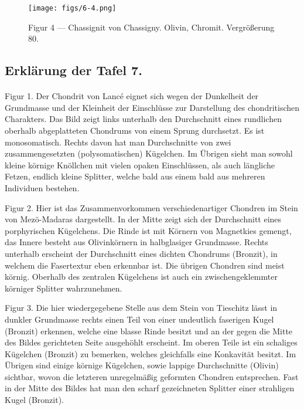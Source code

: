 \documentclass[a4paper, 11pt, oneside, polutonikogreek, german]{article}
\begin{document}
\vspace*{\fill}
\begin{figure}[H]
\centering
\texttt{[image: figs/6-4.png]}
\caption{\small Figur 4 --- Chassignit von Chassigny. Olivin, Chromit. Vergrößerung 80.}
\end{figure}
\vspace*{\fill}
\clearpage

\subsection{Erklärung der Tafel 7.}
\paragraph{}
Figur 1. Der Chondrit von Lancé eignet sich wegen der Dunkelheit der Grundmasse und der Kleinheit der Einschlüsse zur Darstellung des chondritischen Charakters. Das Bild zeigt links unterhalb den Durchschnitt eines rundlichen oberhalb abgeplatteten Chondrums von einem Sprung durchsetzt. Es ist monosomatisch. Rechts davon hat man Durchschnitte von zwei zusammengesetzten (polysomatischen) Kügelchen. Im Übrigen sieht man sowohl kleine körnige Knöllchen mit vielen opaken Einschlüssen, als auch längliche Fetzen, endlich kleine Splitter, welche bald aus einem bald aus mehreren Individuen bestehen.

Figur 2. Hier ist das Zusammenvorkommen verschiedenartiger Chondren im Stein von Mezö-Madaras dargestellt. In der Mitte zeigt sich der Durchschnitt eines porphyrischen Kügelchens. Die Rinde ist mit Körnern von Magnetkies gemengt, das Innere besteht aus Olivinkörnern in halbglasiger Grundmasse. Rechts unterhalb erscheint der Durchschnitt eines dichten Chondrums (Bronzit), in welchem die Fasertextur eben erkennbar ist. Die übrigen Chondren sind meist körnig. Oberhalb des zentralen Kügelchens ist auch ein zwischengeklemmter körniger Splitter wahrzunehmen.

Figur 3. Die hier wiedergegebene Stelle aus dem Stein von Tieschitz lässt in dunkler Grundmasse rechts einen Teil von einer undeutlich faserigen Kugel (Bronzit) erkennen, welche eine blasse Rinde besitzt und an der gegen die Mitte des Bildes gerichteten Seite ausgehöhlt erscheint. Im oberen Teile ist ein schaliges Kügelchen (Bronzit) zu bemerken, welches gleichfalls eine Konkavität besitzt. Im Übrigen sind einige körnige Kügelchen, sowie lappige Durchschnitte (Olivin) sichtbar, wovon die letzteren unregelmäßig geformten Chondren entsprechen. Fast in der Mitte des Bildes hat man den scharf gezeichneten Splitter einer strahligen Kugel (Bronzit).
\end{document}
